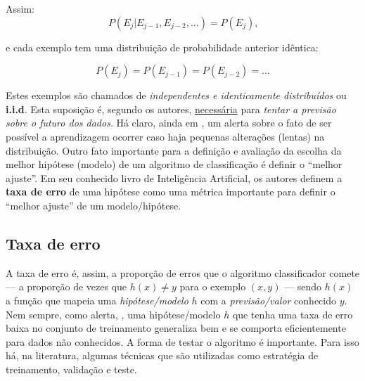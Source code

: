 Assim:
\begin{equation}
	P (E_j|E_{j-1},E_{j-2}, ... ) = P(E_j) \textrm{,} 
\end{equation}

e cada exemplo tem uma distribuição de probabilidade anterior idêntica:

\begin{equation}
P(E_j) = P(E_{j-1}) = P(E_{j-2}) = \dots 
\end{equation}

Estes exemplos são chamados de \textit{independentes e identicamente distribuídos} ou \textbf{i.i.d}. Esta suposição é, segundo os autores, \underline{necessária} para \textit{tentar a previsão sobre o futuro dos dados}. Há claro, ainda em , um alerta sobre o fato de ser possível a aprendizagem ocorrer caso haja pequenas alterações (lentas) na distribuição. Outro fato importante para a definição e avaliação da escolha da melhor hipótese (modelo) de um algoritmo de classificação é definir o ``melhor ajuste''. Em seu conhecido livro de Inteligência Artificial, os autores  definem a \textbf{taxa de erro} de uma hipótese como uma métrica importante para definir o ``melhor ajuste'' de um modelo/hipótese.

\subsection{Taxa de erro}\label{taxa_erro}
A taxa de erro é, assim, a proporção de erros que o algoritmo classificador comete --- a proporção de vezes que $h(x)\neq y$ para o exemplo $(x,y)$ --- sendo $h(x)$ a função que mapeia uma \textit{hipótese/modelo} $h$ com a \textit{previsão/valor} conhecido $y$. Nem sempre, como alerta, , uma hipótese/modelo $h$ que tenha uma taxa de erro baixa no conjunto de treinamento generaliza bem e se comporta eficientemente para dados não conhecidos. A forma de testar o algoritmo é importante. Para isso há, na literatura, algumas técnicas que são utilizadas como estratégia de treinamento, validação e teste.

